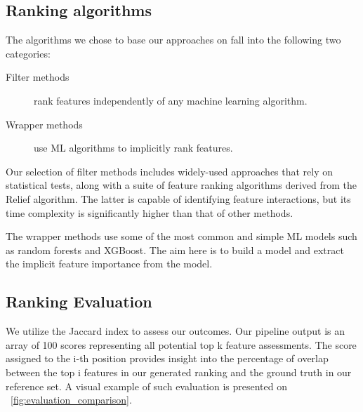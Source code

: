 \documentclass[fleqn,moreauthors,10pt]{ds_report}
\begin{document}
\subsection*{Ranking algorithms}

The algorithms we chose to base our approaches on fall into the following two categories:

\begin{description}
    \item [Filter methods] rank features independently of any machine learning algorithm.
    \item [Wrapper methods] use ML algorithms to implicitly rank features.
\end{description}

Our selection of filter methods includes widely-used approaches that rely on statistical tests, along with a suite of feature ranking algorithms derived from the Relief algorithm. The latter is capable of identifying feature interactions, but its time complexity is significantly higher than that of other methods.

The wrapper methods use some of the most common and simple ML models such as random forests and XGBoost. The aim here is to build a model and extract the implicit feature importance from the model.




\subsection*{Ranking Evaluation}
We utilize the Jaccard index to assess our outcomes. Our pipeline output is an array of 100 scores representing all potential top k feature assessments. The score assigned to the i-th position provides insight into the percentage of overlap between the top i features in our generated ranking and the ground truth in our reference set. A visual example of such evaluation is presented on \figurename~\ref{fig:evaluation_comparison}.
\end{document}
